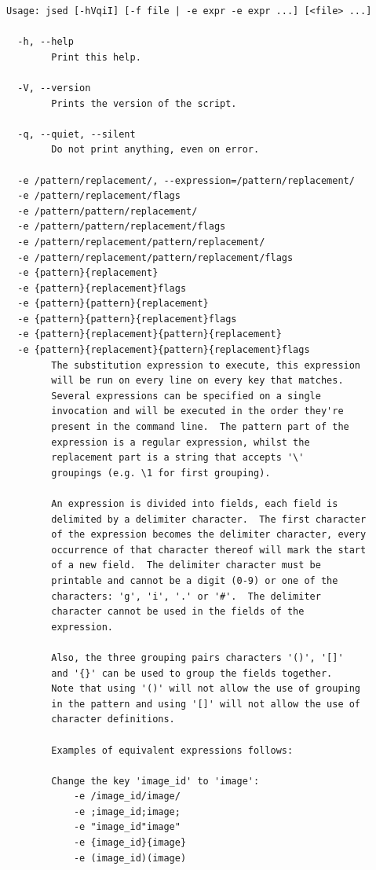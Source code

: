 \documentclass[11pt,a4paper,draft]{report}
\begin{document}
{\small
\begin{verbatim}
Usage: jsed [-hVqiI] [-f file | -e expr -e expr ...] [<file> ...]

  -h, --help
        Print this help.

  -V, --version
        Prints the version of the script.

  -q, --quiet, --silent
        Do not print anything, even on error.

  -e /pattern/replacement/, --expression=/pattern/replacement/
  -e /pattern/replacement/flags
  -e /pattern/pattern/replacement/
  -e /pattern/pattern/replacement/flags
  -e /pattern/replacement/pattern/replacement/
  -e /pattern/replacement/pattern/replacement/flags
  -e {pattern}{replacement}
  -e {pattern}{replacement}flags
  -e {pattern}{pattern}{replacement}
  -e {pattern}{pattern}{replacement}flags
  -e {pattern}{replacement}{pattern}{replacement}
  -e {pattern}{replacement}{pattern}{replacement}flags
        The substitution expression to execute, this expression
        will be run on every line on every key that matches.
        Several expressions can be specified on a single
        invocation and will be executed in the order they're
        present in the command line.  The pattern part of the
        expression is a regular expression, whilst the
        replacement part is a string that accepts '\'
        groupings (e.g. \1 for first grouping).

        An expression is divided into fields, each field is
        delimited by a delimiter character.  The first character
        of the expression becomes the delimiter character, every
        occurrence of that character thereof will mark the start
        of a new field.  The delimiter character must be
        printable and cannot be a digit (0-9) or one of the
        characters: 'g', 'i', '.' or '#'.  The delimiter
        character cannot be used in the fields of the
        expression.

        Also, the three grouping pairs characters '()', '[]'
        and '{}' can be used to group the fields together.
        Note that using '()' will not allow the use of grouping
        in the pattern and using '[]' will not allow the use of
        character definitions.

        Examples of equivalent expressions follows:

        Change the key 'image_id' to 'image':
            -e /image_id/image/
            -e ;image_id;image;
            -e "image_id"image"
            -e {image_id}{image}
            -e (image_id)(image)


\end{verbatim}}
\end{document}
